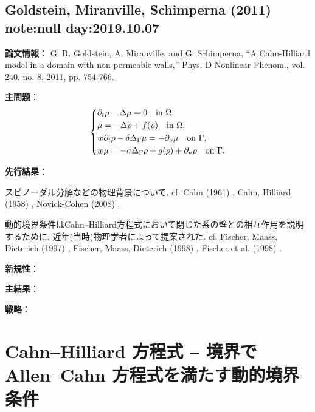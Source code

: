 \documentclass[a4paper]{jsarticle}
\begin{document}
\newpage

\subsection{Goldstein, Miranville, Schimperna (2011) \cite{GoldsteinMiranvilleSchimperna2011} note:null day:2019.10.07}
{\bf 論文情報}：
G. R. Goldstein, A. Miranville, and G. Schimperna, “A Cahn-Hilliard model in a domain with non-permeable walls,” Phys. D Nonlinear Phenom., vol. 240, no. 8, 2011, pp. 754-766.

{\bf 主問題}：
\begin{equation}\left\{\begin{aligned}
	&\partial_t\rho - \Delta\mu = 0\quad\text{in }\Omega,\\
	&\mu = -\Delta\rho + f(\rho)\quad\text{in }\Omega,\\
	&w\partial_t\rho - \delta \Delta_{\Gamma}\mu = -\partial_{\nu}\mu\quad\text{on }\Gamma,\\
	&w\mu = -\sigma\Delta_{\Gamma}\rho + g(\rho) + \partial_{\nu}\rho\quad\text{on }\Gamma.
\end{aligned}\right.\end{equation}


{\bf 先行結果}：

スピノーダル分解などの物理背景について.
cf. Cahn (1961) \cite{Cahn1961}, Cahn, Hilliard (1958) \cite{CahnHilliard1958}, Novick-Cohen (2008) \cite{NovickCohen2008}.

動的境界条件はCahn--Hilliard方程式において閉じた系の壁との相互作用を説明するために, 近年(当時)物理学者によって提案された.
cf. Fischer, Maass, Dieterich (1997) \cite{FixcherMaassDieterich1997}, Fischer, Maass, Dieterich (1998) \cite{FixcherMaassDieterich1998}, Fischer et al. (1998) \cite{FischerETAL1998}.

{\bf 新規性}：

{\bf 主結果}：

{\bf 戦略}：




\newpage

\section{Cahn--Hilliard 方程式 -- 境界で Allen--Cahn 方程式を満たす動的境界条件}
\end{document}
